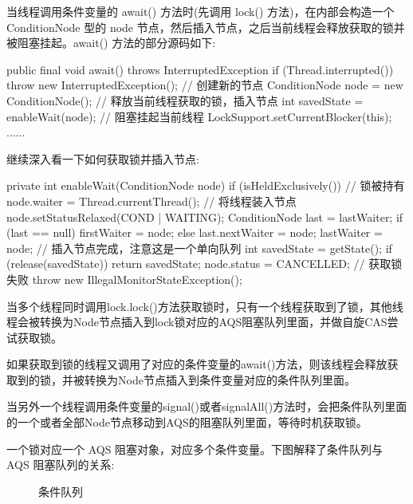 当线程调用条件变量的 await() 方法时(先调用 lock() 方法)，在内部会构造一个 ConditionNode 型的 node 节点，然后插入节点，之后当前线程会释放获取的锁并被阻塞挂起。await() 方法的部分源码如下:

\begin{Java}
public final void await() throws InterruptedException {
    if (Thread.interrupted())
        throw new InterruptedException();
    // 创建新的节点
    ConditionNode node = new ConditionNode();
    // 释放当前线程获取的锁，插入节点
    int savedState = enableWait(node);
    // 阻塞挂起当前线程
    LockSupport.setCurrentBlocker(this);
    ......
}
\end{Java}

继续深入看一下如何获取锁并插入节点:

\begin{Java}
private int enableWait(ConditionNode node) {
    if (isHeldExclusively()) {  // 锁被持有
        node.waiter = Thread.currentThread();   // 将线程装入节点
        node.setStatusRelaxed(COND | WAITING);
        ConditionNode last = lastWaiter;
        if (last == null)
            firstWaiter = node;
        else
            last.nextWaiter = node;     
        lastWaiter = node;              // 插入节点完成，注意这是一个单向队列
        int savedState = getState();
        if (release(savedState))
            return savedState;
    }
    node.status = CANCELLED; // 获取锁失败
    throw new IllegalMonitorStateException();
}
\end{Java}

当多个线程同时调用lock.lock()方法获取锁时，只有一个线程获取到了锁，其他线程会被转换为Node节点插入到lock锁对应的AQS阻塞队列里面，并做自旋CAS尝试获取锁。

如果获取到锁的线程又调用了对应的条件变量的await()方法，则该线程会释放获取到的锁，并被转换为Node节点插入到条件变量对应的条件队列里面。

当另外一个线程调用条件变量的signal()或者signalAll()方法时，会把条件队列里面的一个或者全部Node节点移动到AQS的阻塞队列里面，等待时机获取锁。

一个锁对应一个 AQS 阻塞对象，对应多个条件变量。下图解释了条件队列与 AQS 阻塞队列的关系:

\begin{figure}[H]
    \centering
    \caption{条件队列}
    \label{fig:条件队列}
\end{figure}


